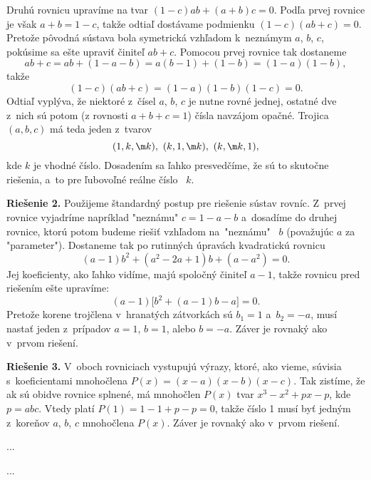 {%
Druhú rovnicu upravíme na tvar
$
(1-c)ab+(a+b)c=0.
$
Podľa prvej rovnice je však $a+b=1-c$, takže odtiaľ
dostávame podmienku
$
(1-c)(ab+c)=0.
$
Pretože pôvodná sústava bola symetrická vzhľadom k~neznámym $a$,
$b$, $c$, pokúsime sa ešte upraviť činiteľ $ab+c$. Pomocou prvej
rovnice tak dostaneme
$$
ab+c=ab+(1-a-b)=a(b-1)+(1-b)=(1-a)(1-b),
$$
takže
$$
(1-c)(ab+c)=(1-a)(1-b)(1-c)=0.
$$
Odtiaľ vyplýva, že niektoré z~čísel $a$, $b$,
$c$ je nutne rovné jednej, ostatné dve z~nich sú potom (z rovnosti
$a+b+c=1$) čísla navzájom opačné. Trojica $(a,b,c)$ má teda
jeden z~tvarov
$$
(1,k,\m k),\ (k,1,\m k),\ (k,\m k,1),
$$
kde $k$ je vhodné číslo. Dosadením sa ľahko presvedčíme, že sú
to skutočne riešenia, a~to pre ľubovoľné reálne číslo~ $k$.

\medskip
{\bf Riešenie 2.} Použijeme štandardný postup pre riešenie sústav
rovníc. Z~prvej rovnice vyjadríme napríklad "neznámu" $c=1-a-b$
a~dosadíme do druhej rovnice, ktorú potom budeme riešiť vzhľadom
na~"neznámu"~ $b$ (považujúc $a$ za "parameter"). Dostaneme tak po
rutinných úpravách kvadratickú rovnicu
$$
(a-1)b^2+(a^2-2a+1)b+(a-a^2)=0.
$$
Jej koeficienty, ako ľahko vidíme, majú spoločný činiteľ
$a-1$, takže rovnicu pred riešením ešte upravíme:
$$
(a-1)\bigl[b^2+(a-1)b-a\bigr]=0.
$$
Pretože korene trojčlena v~hranatých zátvorkách sú $b_1=1$
a~$b_2=-a$, musí nastať jeden z~prípadov $a=1$, $b=1$, alebo $b=-a$.
Záver je rovnaký ako v~prvom riešení.

\medskip
{\bf Riešenie 3.} V~oboch rovniciach vystupujú výrazy, ktoré, ako
vieme, súvisia s~koe\-fi\-cien\-tami mnohočlena $P(x)=(x-a)(x-b)(x-c)$.
Tak zistíme, že ak sú obidve rovnice splnené, má mnohočlen $P(x)$
tvar $x^3-x^2+px-p$, kde $p=abc$. Vtedy platí $P(1)=1-1+p-p=0$,
takže číslo 1 musí byť jedným z~koreňov $a$, $b$, $c$ mnohočlena
$P(x)$. Záver je rovnaký ako v~prvom riešení.
}

{%
...}

{%
...}

